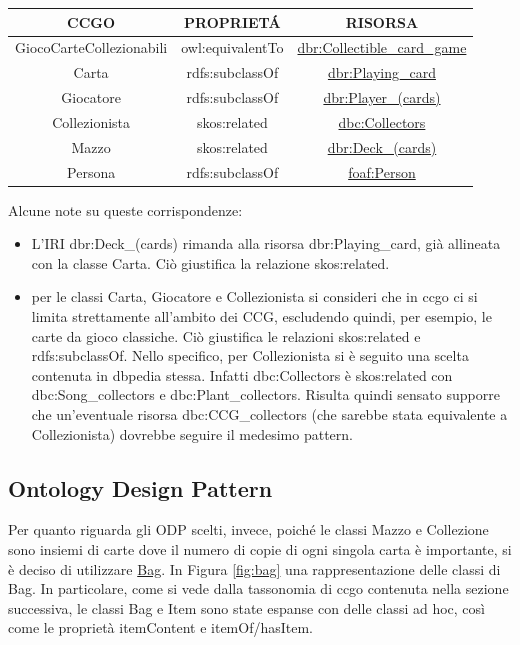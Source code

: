 \documentclass[12pt]{article}
\begin{document}
\begin{center}
\begin{tabular}{ |c|c|c| } 
 \hline
CCGO & PROPRIET\'A & RISORSA \\
 \hline
 GiocoCarteCollezionabili & owl:equivalentTo & \href{http://dbpedia.org/resource/Collectible_card_game}{dbr:Collectible\_card\_game} \\ 
 
 Carta & rdfs:subclassOf & \href{http://dbpedia.org/resource/Playing_card}{dbr:Playing\_card} \\ 
 
 Giocatore & rdfs:subclassOf & \href{http://dbpedia.prg/resource/Player_(cards)}{dbr:Player\_(cards)} \\ 
 
 Collezionista & skos:related & \href{http://dbpedia.org/resource/Category:Collectors}{dbc:Collectors} \\

 Mazzo & skos:related & \href{http://dbpedia.org/resource/Deck_(cards)}{dbr:Deck\_(cards)} \\

 Persona & rdfs:subclassOf & \href{http://xmlns.com/foaf/0.1/#Person}{foaf:Person} \\
 \hline
\end{tabular}
\end{center}

Alcune note su queste corrispondenze:
\begin{itemize}
    \item L'IRI dbr:Deck\_(cards) rimanda alla risorsa dbr:Playing\_card, già allineata con la classe Carta. Ciò giustifica la relazione skos:related.
    \item per le classi Carta, Giocatore e Collezionista si consideri che in ccgo ci si limita strettamente all'ambito dei CCG, escludendo quindi, per esempio, le carte da gioco classiche. Ciò giustifica le relazioni skos:related e rdfs:subclassOf. Nello specifico, per Collezionista si è seguito una scelta contenuta in dbpedia stessa. Infatti dbc:Collectors è skos:related con dbc:Song\_collectors e dbc:Plant\_collectors. Risulta quindi sensato supporre che un'eventuale risorsa dbc:CCG\_collectors (che sarebbe stata equivalente a Collezionista) dovrebbe seguire il medesimo pattern.
\end{itemize}


\subsection{Ontology Design Pattern}
Per quanto riguarda gli ODP scelti, invece, poiché le classi Mazzo e Collezione sono insiemi di carte dove il numero di copie di ogni singola carta è importante, si è deciso di utilizzare \href{http://ontologydesignpatterns.org/wiki/Submissions:Bag}{Bag}.
In Figura \ref{fig:bag} una rappresentazione delle classi di Bag. In particolare, come si vede dalla tassonomia di ccgo contenuta nella sezione successiva, le classi Bag e Item sono state espanse con delle classi ad hoc, così come le proprietà itemContent e itemOf/hasItem.
\end{document}
